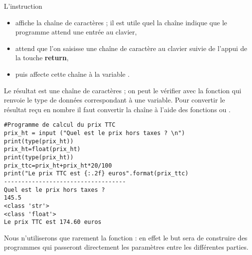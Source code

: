L'instruction  
\begin{itemize}
\item affiche la chaîne de caractères  ; il est utile quel la chaîne indique que le programme attend une entrée au clavier,
\item attend que l'on saisisse une chaîne de caractère au clavier suivie de l'appui de la touche {\bf return},
\item puis affecte cette chaîne à la variable .
\end{itemize}
Le résultat est une chaîne de caractères ; on peut le vérifier avec la fonction  qui renvoie le type de données correspondant à une variable. Pour convertir le résultat reçu en nombre il faut convertir la chaîne à l'aide des fonctions  ou .

\begin{lstlisting}[float=ht,caption={Calcul du prix TTC},label=TTC]
#Programme de calcul du prix TTC
prix_ht = input ("Quel est le prix hors taxes ? \n")
print(type(prix_ht)) 
prix_ht=float(prix_ht)
print(type(prix_ht))
prix_ttc=prix_ht+prix_ht*20/100
print("Le prix TTC est {:.2f} euros".format(prix_ttc)
-----------------------------------
Quel est le prix hors taxes ? 
145.5
<class 'str'>
<class 'float'>
Le prix TTC est 174.60 euros
\end{lstlisting}

Nous n'utiliserons que rarement la fonction  : en effet le but sera de construire des programmes qui passeront directement les paramètres entre les différentes parties.
